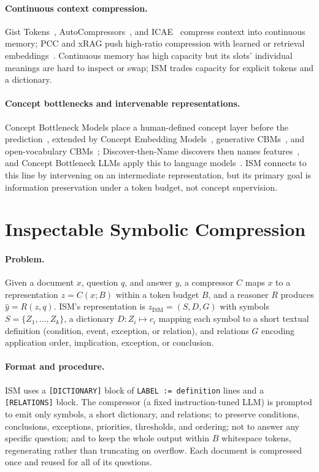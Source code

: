 \documentclass{article}
\begin{document}
\paragraph{Continuous context compression.}
Gist Tokens~\cite{mu2023gist}, AutoCompressors~\cite{chevalier2023autocomp}, and
ICAE~\cite{ge2024icae} compress context into continuous memory; PCC and xRAG push
high-ratio compression with learned or retrieval embeddings~\cite{dai2025pcc,
cheng2024xrag}. Continuous memory has high capacity but its slots' individual
meanings are hard to inspect or swap; ISM trades capacity for explicit tokens and
a dictionary.

\paragraph{Concept bottlenecks and intervenable representations.}
Concept Bottleneck Models place a human-defined concept layer before the
prediction~\cite{koh2020cbm}, extended by Concept Embedding
Models~\cite{zarlenga2022cem}, generative CBMs~\cite{ismail2024gencbm}, and
open-vocabulary CBMs~\cite{tan2024ovcbm}; Discover-then-Name discovers then names
features~\cite{rao2024dtn}, and Concept Bottleneck LLMs apply this to language
models~\cite{sun2024cbllm}. ISM connects to this line by intervening on an
intermediate representation, but its primary goal is information preservation
under a token budget, not concept supervision.

\section{Inspectable Symbolic Compression}
\paragraph{Problem.}
Given a document $x$, question $q$, and answer $y$, a compressor $C$ maps $x$ to a
representation $z=C(x;B)$ within a token budget $B$, and a reasoner $R$ produces
$\hat{y}=R(z,q)$. ISM's representation is $z_{\mathrm{ISM}}=(S,D,G)$ with symbols
$S=\{Z_1,\dots,Z_k\}$, a dictionary $D:Z_i\mapsto c_i$ mapping each symbol to a
short textual definition (condition, event, exception, or relation), and relations
$G$ encoding application order, implication, exception, or conclusion.

\paragraph{Format and procedure.}
ISM uses a \texttt{[DICTIONARY]} block of \texttt{LABEL := definition} lines and a
\texttt{[RELATIONS]} block. The compressor (a fixed instruction-tuned LLM) is
prompted to emit only symbols, a short dictionary, and relations; to preserve
conditions, conclusions, exceptions, priorities, thresholds, and ordering; not to
answer any specific question; and to keep the whole output within $B$
whitespace tokens, regenerating rather than truncating on overflow. Each document
is compressed once and reused for all of its questions.
\end{document}
